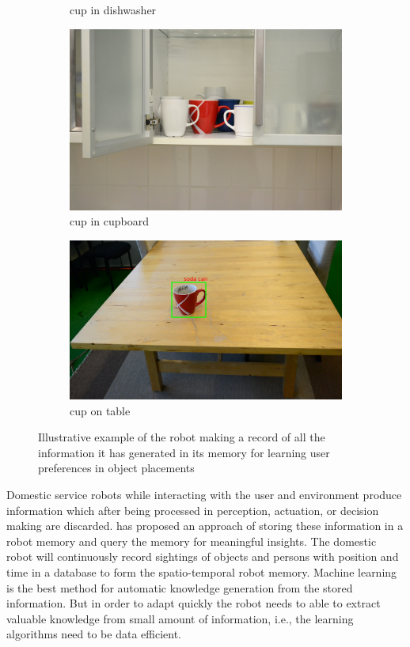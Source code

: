 \begin{figure}[htp]
\begin{subfigure}{.24\textwidth}
    \caption{cup in dishwasher}
\end{subfigure}
\begin{subfigure}{.24\textwidth}
  \centering
  \includegraphics[width=\linewidth]{images/cup_cupboard.jpg}
    \caption{cup in cupboard}
\end{subfigure}
\begin{subfigure}{.255\textwidth}
  \centering
  \includegraphics[width=\linewidth]{images/robot_view_cup.jpg}
    \caption{cup on table}
\end{subfigure}

\caption[Illustrative example]{Illustrative example of the robot making a record of all the information it has generated in its memory for learning user preferences in object placements}
\end{figure}

Domestic service robots while interacting with the user and environment produce information which after being processed in perception, actuation, or decision making are discarded. \cite{niemueller2012generic} has proposed an approach of storing these information in a robot memory and query the memory for meaningful insights. 
The domestic robot will continuously record sightings of objects and persons with position and time in a database to form the spatio-temporal robot memory. Machine learning is the best method for automatic knowledge generation from the stored information. But in order to adapt quickly the robot needs to able to extract valuable knowledge from small amount of information, i.e., the learning algorithms need to be data efficient.

